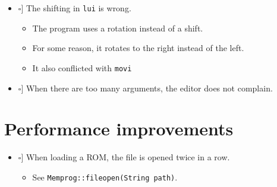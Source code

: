\documentclass[12pt,a4paper]{extarticle}
\newcommand{\done}{\makebox[0pt][l]{$\square$}\raisebox{.15ex}{\hspace{0.1em}$\checkmark$}}%
\newcommand{\notdone}{\makebox[1em][l]{$\square$}}
\begin{document}
\begin{itemize}
  \item[\done] The shifting in \texttt{lui} is wrong.
    \begin{itemize}
      \item The program uses a rotation instead of a shift.
      \item For some reason, it rotates to the right instead of the left.
      \item It also conflicted with \texttt{movi}
    \end{itemize}

    \item[\notdone] When there are too many arguments, the editor does not complain.


\end{itemize}

\section{Performance improvements}

\begin{itemize}
  \item[\notdone] When loading a ROM, the file is opened twice in a row.
    \begin{itemize}
      \item See \texttt{Memprog::fileopen(String path)}.
    \end{itemize}
  \end{itemize}
\end{document}
